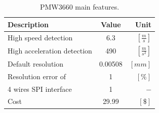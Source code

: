 \documentclass[12pt,a4paper, twoside]{article}
\begin{document}
\begin{table}[H]
	\centering
	\begin{tabular}{l||c|r} 
		\textbf{Description}&\textbf{Value}  &\textbf{Unit}  \\ 
		\hline
		\hline 
		High speed detection & 6.3 & $[\frac{m}{s}]$ \\ 
		\hline 
		High acceleration detection & 490  & $[\frac{m}{s^2}]$  \\ 
		\hline 
		Default resolution & 0.00508 & $[mm]$ \\ 
		\hline 
		Resolution error of & 1 & $[\%]$  \\ 
		\hline 
		4 wires SPI interface & 1 & $-$  \\ 
		\hline
		Cost & 29.99 &$[\$]$
	\end{tabular} 
	\caption{PMW3660 main features.}
	\label{tab:PMW3360}
\end{table}
\end{document}
